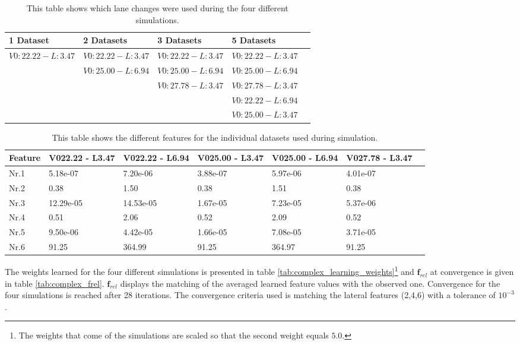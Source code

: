 \begin{table}[h!]
	\centering
	\begin{tabular}{@{}llllr@{}} \toprule
		1 Dataset    & 2 Datasets & 3 Datasets & 5 Datasets\\ \midrule
     $V0:22.22 - L:3.47$  & $V0:22.22 - L:3.47$    & $V0:22.22 - L:3.47$ & $V0:22.22 - L:3.47$		\\
           			 & $V0:25.00 - L:6.94$      & $V0:25.00 - L:6.94$    & $V0:25.00 - L:6.94$  \\
	        		 &        & $V0:27.78 - L:3.47$ & $V0:27.78 - L:3.47$      \\ 
&	&	&$V0:22.22 - L:6.94$	\\
&	&	&$V0:25.00 - L:3.47$	\\\bottomrule
	\end{tabular}
	\caption{This table shows which lane changes were used during the four different simulations.}
	\label{tab:datasets_overview}
\end{table} 


\begin{table}[h!]
	\centering
	\begin{tabular}{@{}llllllr@{}} \toprule
	\textbf{Feature}     & V022.22 - L3.47 & 	V022.22 - L6.94 & V025.00 - L3.47 &	V025.00 - L6.94 & V027.78 - L3.47\\ \midrule
		Nr.1       		  &5.18e-07 &7.20e-06  	& 3.88e-07     & 5.97e-06  & 4.01e-07\\
		Nr.2              & 0.38 &1.50&	     0.38      & 1.51    &       0.38       \\
		Nr.3              & 12.29e-05&14.53e-05	& 1.67e-05 &	7.23e-05 &5.37e-06\\
		Nr.4              & 0.51 &2.06&	         0.52 &          2.09   &   0.52    \\
		Nr.5              & 9.50e-06&4.42e-05   & 1.66e-05      & 7.08e-05  & 3.71e-05       \\
		Nr.6              & 91.25 &	364.99      &	91.25	&364.97       & 91.25       \\ \bottomrule
	\end{tabular}
	\caption{This table shows the different features for the individual datasets used during simulation.}
	\label{tab:indi_features}
\end{table} 

The weights learned for the four different simulations is presented in table \ref{tab:complex_learning_weights}\footnote{The weights that come of the simulations are scaled so that the second weight equals $5.0$.} and $\bm{f}_{rel}$ at convergence is given in table \ref{tab:complex_frel}.   $\bm{f}_{rel}$ displays the matching of the averaged learned feature values with the observed one. Convergence for the four simulations is reached after 28 iterations. The convergence criteria used is matching the lateral features (2,4,6) with a tolerance of $10^{-3}$.\\

